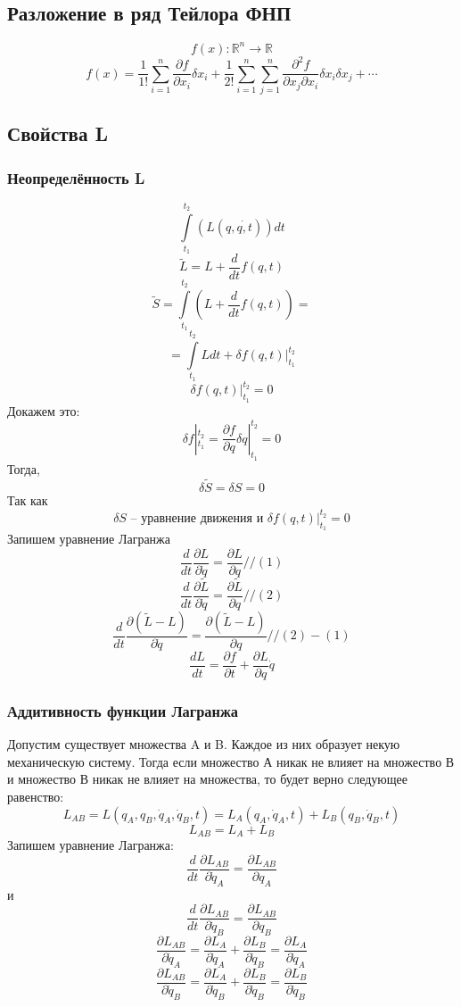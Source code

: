 \documentclass[a4paper, 12pt, titlepage, fleqn]{article}
\newcommand{\Real}{\mathbb{R}}
\newcommand{\T}{\textbf}
\newcommand{\D}{\partial}
\begin{document}
		\subsection{Разложение в ряд Тейлора ФНП}
			\[
				f(x) : \Real^n \to \Real
			\]
			\[
				f(x) = \frac{1}{1!}\sum\limits_{i = 1}^{n}\frac{\D f}{\D x_i}\delta x_i + \frac{1}{2!}\sum\limits_{i = 1}^{n}\sum\limits_{j = 1}^{n}\frac{\D^2 f}{\D x_j \D x_i}\delta x_i\delta x_j + \cdots
			\]
		\subsection{Свойства L}
			\subsubsection{Неопределённость L}
				\[
					\int\limits_{t_1}^{t_2}\left(L(q, \dot{q, t})\right)dt
				\]
				\[
					\tilde{L} = L + \frac{d}{dt}f(q, t)
				\]
				\[
					\tilde{S} = \int\limits_{t_1}^{t_2} \left(L + \frac{d}{dt}f(q, t)\right) =
				\]
				\[
					= \int\limits_{t_1}^{t_2} Ldt + \delta f(q, t) |_{t_1}^{t_2}
				\]
				\[
					\delta f(q, t) |_{t_1}^{t_2} = 0
				\]
				Докажем это:
				\[
					\delta f |_{t_1}^{t_2} = \frac{\D f}{\D q}\delta q|_{t_1}^{t_2} = 0
				\]
				Тогда,
				\[
					\delta\tilde{S} = \delta S = 0
				\]
				Так как
				\[
					\delta S  \T{ -- уравнение движения и } \delta f(q, t) |_{t_1}^{t_2} = 0 
				\]
				Запишем уравнение Лагранжа
				\[
					\frac{d}{dt}\frac{\D L}{\D \dot{q}} = \frac{\D L}{\D q} //(1) 
				\]
				\[
					\frac{d}{dt}\frac{\D \tilde{L}}{\D \dot{q}} = \frac{\D \tilde{L}}{\D q} //(2)
				\]
				\[
					\frac{d}{dt}\frac{\D(\tilde{L} - L)}{\D \dot{q}} = \frac{\D(\tilde{L} - L)}{\D q} //   (2) - (1)
				\]
				\[
					\frac{d L}{dt} = \frac{\D f}{\D t} + \frac{\D L}{\D q}\dot{q}
				\]
			\subsubsection{Аддитивность функции Лагранжа}
				Допустим существует множества A и B. Каждое из них образует некую механическую систему. Тогда если множество А никак не влияет на множество В и множество В никак не влияет на множества, то будет верно следующее равенство:
				\[
					L_{AB} = L(q_A, q_B, \dot{q}_A, \dot{q}_B, t) = L_A(q_A, \dot{q}_A, t) + L_B(q_B, \dot{q}_B, t)
				\]
				\[
					L_{AB} = L_A + L_B
				\]
				Запишем уравнение Лагранжа:
				\[
					\frac{d}{dt}\frac{\D L_{AB}}{\D \dot{q}_A} = \frac{\D L_{AB}}{\D q_A}
				\]
				и
				\[
					\frac{d}{dt}\frac{\D L_{AB}}{\D \dot{q}_B} = \frac{\D L_{AB}}{\D q_B} 
				\]
				\[
					\frac{\D L_{AB}}{\D \dot{q}_A} = \frac{\D L_A}{\D \dot{q}_A} + \frac{\D L_B}{\D \dot{q}_B} = \frac{\D L_A}{\D \dot{q}_A}	
				\]
				\[
					\frac{\D L_{AB}}{\D\dot{q}_B} = \frac{\D L_A}{\D\dot{q}_B} + \frac{\D L_B}{\D\dot{q}_B} = \frac{\D L_B}{\D\dot{q}_B}
				\]
\end{document}
